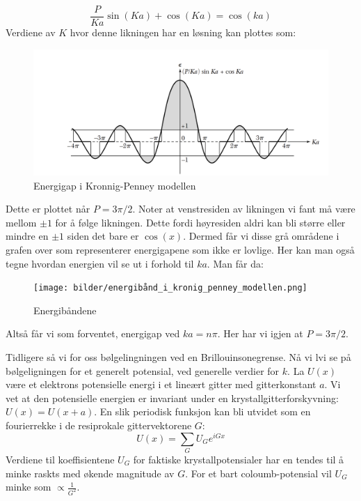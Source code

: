 \documentclass{article}
\begin{document}
\begin{equation}
    \frac{P}{Ka} \sin(Ka) + \cos(Ka) = \cos(ka)
\end{equation}
Verdiene av $K$ hvor denne likningen har en løsning kan plottes som:
\begin{figure}[H]
    \centering
    \includegraphics[width=0.5\linewidth]{bilder/energigap_kronigpenney_modellen.png}
    \caption{Energigap i Kronnig-Penney modellen}
\label{fig:energigap_kronigpenney_modellenl}
\end{figure}
Dette er plottet når $P = 3 \pi / 2$. Noter at venstresiden av likningen vi fant må være mellom $\pm 1$ for å følge likningen. Dette fordi høyresiden aldri kan bli større eller mindre en $\pm 1$ siden det bare er $\cos(x)$. Dermed får vi disse grå områdene i grafen over som representerer energigapene som ikke er lovlige. Her kan man også tegne hvordan energien vil se ut i forhold til $ka$. Man får da:
\begin{figure}[H]
    \centering
    \texttt{[image: bilder/energibånd\_i\_kronig\_penney\_modellen.png]}
    \caption{Energibåndene}
    \label{fig:energibånd_i_kronig_penney_modellen}
\end{figure}
Altså får vi som forventet, energigap ved $ka = n \pi$. Her har vi igjen at $ P = 3\pi / 2$.

Tidligere så vi for oss bølgelingningen ved en Brillouinsonegrense. Nå vi lvi se på bølgeligningen for et generelt potensial, ved generelle verdier for $k$. La $U(x)$ være et elektrons potensielle energi i et lineært gitter med gitterkonstant $a$. Vi vet at den potensielle energien er invariant under en krystallgitterforskyvning: $U(x) = U(x+a)$. En slik periodisk funksjon kan bli utvidet som en fourierrekke i de resiprokale gittervektorene $G$:
\begin{equation}
    U(x) = \sum_G U_G e^{i G x}
\end{equation}
Verdiene til koeffisientene $U_G$ for faktiske krystallpotensialer har en tendes til å minke raskts med økende magnitude av $G$. For et bart coloumb-potensial vil $U_G$ minke som $\propto\frac{1}{G^2}$.
\end{document}
